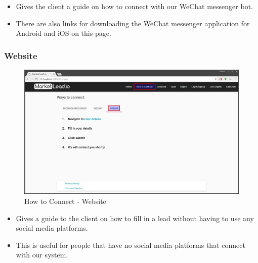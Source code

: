 \documentclass{article}
\begin{document}
				\begin{itemize}
					\item Gives the client a guide on how to connect with our WeChat messenger bot.
					\item There are also links for downloading the WeChat messenger application for Android and iOS on this page.
				\end{itemize}

			\subsubsection{Website}
				\begin{figure}[H]
					\includegraphics[width=\textwidth]{images/how_to_connect_website.jpg}
					\caption{How to Connect - Website}
				\end{figure}

				\begin{itemize}
					\item Gives a guide to the client on how to fill in a lead without having to use any social media platforms.
					\item This is useful for people that have no social media platforms that connect with our system.
				\end{itemize}
\end{document}
